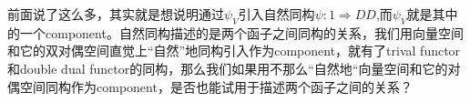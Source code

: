 \documentclass[UTF8,11pt,a4paper]{ctexart}%
\begin{document}
\begin{center}
\end{center}

前面说了这么多，其实就是想说明通过$\psi_{V}$引入自然同构$\psi\colon 1 \Rightarrow DD$,而$\psi_{V}$就是其中的一个component。自然同构描述的是两个函子之间同构的关系，我们用向量空间和它的双对偶空间直觉上“自然”地同构引入作为component，就有了trival functor和double dual functor的同构，那么我们如果用不那么“自然地“向量空间和它的对偶空间同构作为component，是否也能试用于描述两个函子之间的关系？
\end{document}
